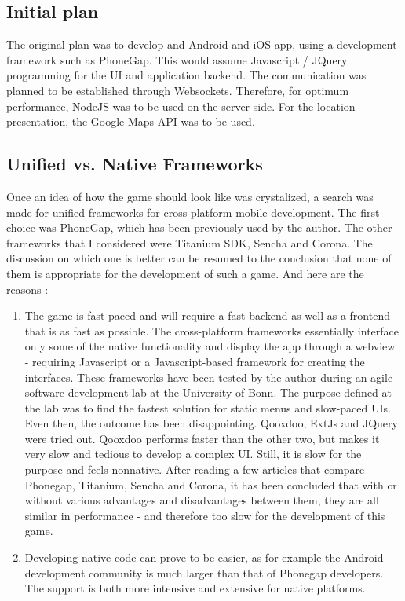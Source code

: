 \documentclass{article}
\begin{document}
\subsection{Initial plan}

The original plan was to develop and Android and iOS app, using a development
framework such as PhoneGap. This would assume Javascript / JQuery programming
for the UI and application backend. The communication was planned to be
established through Websockets. Therefore, for optimum performance, NodeJS was
to be used on the server side. For the location presentation, the Google Maps
API was to be used.

\subsection{Unified vs. Native Frameworks}

Once an idea of how the game should look like was crystalized, a search was
made for unified frameworks for cross-platform mobile development. The first
choice was PhoneGap, which has been previously used by the author. The other
frameworks that I considered were Titanium SDK, Sencha and Corona. The
discussion on which one is better can be resumed to the conclusion that none of
them is appropriate for the development of such a game.
And here are the reasons : 
\begin{enumerate}
  \item The game is fast-paced and will require a fast backend as well as a
  frontend that is as fast as possible. The cross-platform frameworks
  essentially interface only some of the native functionality and display the
  app through a webview - requiring Javascript or a Javascript-based framework
  for creating the interfaces. These frameworks have been tested by the author
  during an agile software development lab at the University of Bonn. The
  purpose defined at the lab was to find the fastest solution for static menus
  and slow-paced UIs. Even then, the outcome has been disappointing. Qooxdoo,
  ExtJs and JQuery were tried out. Qooxdoo performs faster than the other two,
  but makes it very slow and tedious to develop a complex UI. Still, it is slow
  for the purpose and feels nonnative. After reading a few articles that
  compare Phonegap, Titanium, Sencha and Corona, it has been concluded that with
  or without various advantages and disadvantages between them, they are all
  similar in performance - and therefore too slow for the development of this
  game.  
  
  \item Developing native code can prove to be easier, as for example the
  Android development community is much larger than that of Phonegap developers.
  The support is both more intensive and extensive for native platforms.
  
\end{enumerate}
\end{document}
